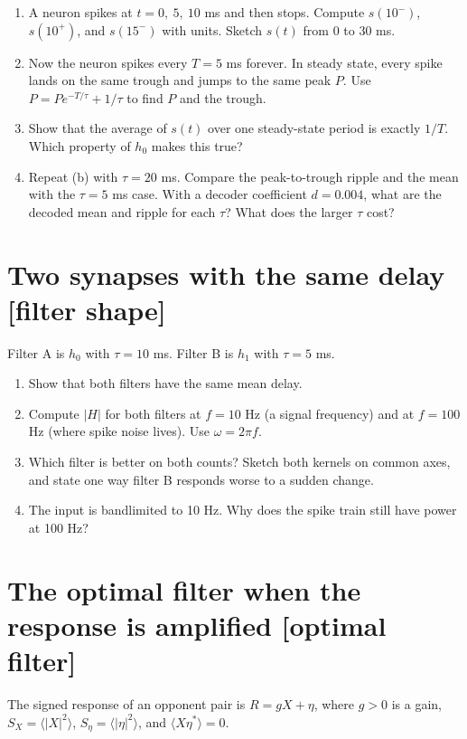 \documentclass[11pt,letterpaper]{article}
\begin{document}
\begin{enumerate}
\item A neuron spikes at $t = 0,\ 5,\ 10$ ms and then stops. Compute $s(10^-)$, \ $s(10^+)$, and $s(15^-)$ with units. Sketch $s(t)$ from $0$ to $30$ ms.
\item Now the neuron spikes every $T = 5$ ms forever. In steady state, every spike lands on the same trough and jumps to the same peak $P$. Use $P = P e^{-T/\tau} + 1/\tau$ to find $P$ and the trough.
\item Show that the average of $s(t)$ over one steady-state period is exactly $1/T$. Which property of $h_0$ makes this true?
\item Repeat (b) with $\tau = 20$ ms. Compare the peak-to-trough ripple and the mean with the $\tau = 5$ ms case. With a decoder coefficient $d = 0.004$, what are the decoded mean and ripple for each $\tau$? What does the larger $\tau$ cost?
\end{enumerate}

\section{Two synapses with the same delay \hfill [filter shape]}

Filter A is $h_0$ with $\tau = 10$ ms. Filter B is $h_1$ with $\tau = 5$ ms.

\begin{enumerate}
\item Show that both filters have the same mean delay.
\item Compute $|H|$ for both filters at $f = 10$ Hz (a signal frequency) and at $f = 100$ Hz (where spike noise lives). Use $\omega = 2\pi f$.
\item Which filter is better on both counts? Sketch both kernels on common axes, and state one way filter B responds worse to a sudden change.
\item The input is bandlimited to 10 Hz. Why does the spike train still have power at 100 Hz?
\end{enumerate}

\section{The optimal filter when the response is amplified \hfill [optimal filter]}

The signed response of an opponent pair is $R = gX + \eta$, where $g > 0$ is a gain, $S_X = \langle |X|^2 \rangle$, $S_\eta = \langle |\eta|^2 \rangle$, and $\langle X \eta^* \rangle = 0$.
\end{document}
